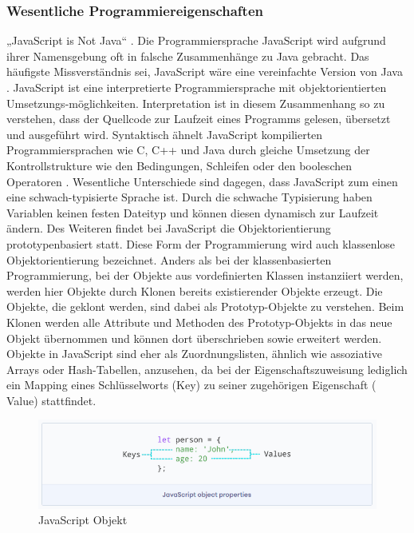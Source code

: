 \subsubsection{Wesentliche Programmiereigenschaften}
„JavaScript is Not Java“  \cite{JS1.091}. Die Programmiersprache JavaScript wird aufgrund ihrer Namensgebung oft in falsche Zusammenhänge zu Java gebracht. Das häufigste Missverständnis sei, JavaScript wäre eine vereinfachte Version von Java \cite{JS1.091}.
\newline
\noindent
JavaScript ist eine interpretierte Programmiersprache mit objektorientierten Umsetzungs-möglichkeiten. Interpretation ist in diesem Zusammenhang so zu verstehen, dass der Quellcode zur Laufzeit eines Programms gelesen, übersetzt und ausgeführt wird.
Syntaktisch ähnelt JavaScript kompilierten Programmiersprachen wie C, C++ und Java durch gleiche Umsetzung der Kontrollstrukture wie den Bedingungen, Schleifen oder den booleschen Operatoren \cite{JS1.1}. Wesentliche Unterschiede sind dagegen, dass JavaScript zum einen eine schwach-typisierte Sprache ist. Durch die schwache Typisierung haben Variablen keinen festen Dateityp und können diesen dynamisch zur Laufzeit ändern. Des Weiteren findet bei JavaScript die Objektorientierung prototypenbasiert statt. Diese Form der Programmierung wird auch klassenlose Objektorientierung bezeichnet. Anders als bei der klassenbasierten Programmierung, bei der Objekte aus vor\-de\-fi\-niert\-en Klassen instanziiert werden, werden hier Objekte durch Klonen bereits existierender Objekte erzeugt. Die Objekte, die geklont werden, sind dabei als Prototyp-Objekte zu ver\-steh\-en. Beim Klonen werden alle Attribute und Methoden des Prototyp-Objekts in das neue Objekt übernommen und können dort überschrieben sowie erweitert werden. Objekte in JavaScript sind eher als Zuordnungslisten, ähnlich wie assoziative Arrays oder Hash-Tabellen, anzusehen, da bei der Eigenschaftszuweisung lediglich ein Mapping eines Schlüsselworts (Key) zu seiner zugehörigen Eigenschaft ( Value) stattfindet.
\newline

\begin{figure}[h]
\centering
\includegraphics[width=\textwidth]{images/JavaScript_Object.PNG}
\caption{JavaScript Objekt \cite{JS1.29}}
\end{figure}



